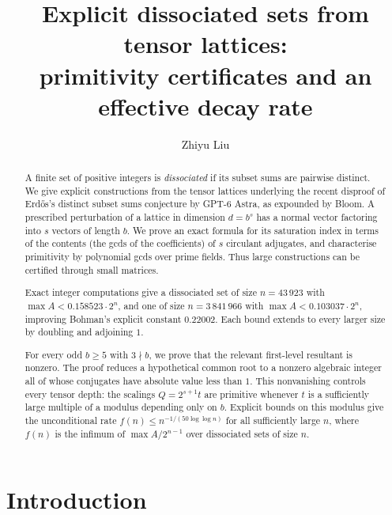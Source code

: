 \documentclass[12pt]{article}
\title{Explicit dissociated sets from tensor lattices:\\ primitivity certificates and an effective decay rate}
\author{Zhiyu Liu}
\begin{document}
\maketitle

\begin{abstract}
A finite set of positive integers is \emph{dissociated} if its subset sums are pairwise distinct. We give explicit
constructions from the tensor lattices underlying the recent disproof of Erd\H{o}s's distinct subset sums conjecture
by GPT-6 Astra, as expounded by Bloom. A prescribed perturbation of a lattice in dimension $d=b^s$ has a normal vector
factoring into $s$ vectors of length $b$. We prove an exact formula for its saturation index in terms of the contents
(the gcds of the coefficients) of $s$ circulant adjugates, and characterise primitivity by polynomial gcds over prime
fields. Thus large constructions
can be certified through small matrices.

Exact integer computations give a dissociated set of size $n=43\,923$ with $\max A<0.158523\cdot2^n$, and one of size
$n=3\,841\,966$ with $\max A<0.103037\cdot2^n$, improving Bohman's explicit constant $0.22002$. Each bound extends to
every larger size by doubling and adjoining $1$.

For every odd $b\ge5$ with $3\nmid b$, we prove that the relevant first-level resultant is nonzero. The proof reduces
a hypothetical common root to a nonzero algebraic integer all of whose conjugates have absolute value less than $1$.
This nonvanishing controls every tensor depth: the scalings $Q=2^{s+1}t$ are primitive whenever $t$ is a sufficiently
large multiple of a modulus depending only on $b$. Explicit bounds on this modulus give the unconditional rate
$f(n)\le n^{-1/(50\log\log n)}$ for all sufficiently large $n$, where $f(n)$ is the infimum of $\max A/2^{n-1}$ over
dissociated sets of size $n$.
\end{abstract}

\section{Introduction}
\end{document}
